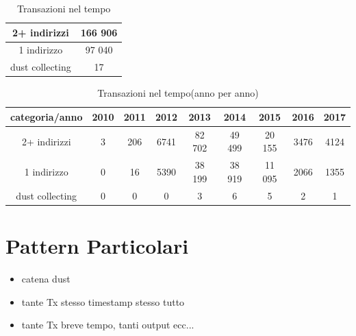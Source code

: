 \begin{table}[H]
    \centering
    \begin{tabular}{|c|c|}
        \hline
        2+ indirizzi & 166 906\\
        \hline
        1 indirizzo & 97 040\\
        \hline
        dust collecting & 17\\
        \hline
    \end{tabular}
    \caption{Transazioni nel tempo}
    \label{tab:tx_categories}
\end{table}
\begin{table}[H]
    \centering
    \begin{tabular}{|c|c|c|c|c|c|c|c|c|}
        \hline
            categoria/anno  & 2010 & 2011 & 2012 & 2013 & 2014 & 2015 & 2016 & 2017\\
        \hline 
         2+ indirizzi &  3 & 206 & 6741 & 82 702 & 49 499 & 20 155 & 3476 & 4124 \\
         \hline
         1 indirizzo & 0 & 16 & 5390 & 38 199 & 38 919 & 11 095 & 2066 & 1355  \\
         \hline
         dust collecting & 0 & 0 & 0 & 3 & 6 & 5 & 2 & 1 \\
         \hline
    \end{tabular}
    \caption{Transazioni nel tempo(anno per anno)}
    \label{tab:tx_categories_year}
\end{table}
\section{Pattern Particolari}
\begin{itemize}
    \item catena dust
    \item tante Tx stesso timestamp stesso tutto
    \item tante Tx breve tempo, tanti output ecc...
\end{itemize}